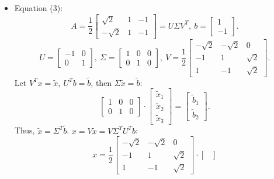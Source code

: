\documentclass[14pt, notitlepage]{article}
\begin{document}
\begin{itemize}
    \item Equation (3):
        \[
            A = \frac{1}{2} \begin{bmatrix}
                \sqrt{2} & 1 & -1 \\
                -\sqrt{2} & 1 & -1
            \end{bmatrix} = U \Sigma V^T,\ b = \begin{bmatrix}
                1 \\ -1
            \end{bmatrix}.
        \]
        \[
            U = \begin{bmatrix}
                -1 & 0 \\
                0 & 1
            \end{bmatrix},\ \Sigma = \begin{bmatrix}
                1 & 0 & 0 \\
                0 & 1 & 0
            \end{bmatrix},\ V = \frac{1}{2} \begin{bmatrix}
                -\sqrt{2} & -\sqrt{2} & 0 \\
                -1 & 1 & \sqrt{2} \\
                1 & -1 & \sqrt{2}
            \end{bmatrix}.
        \]
        Let $V^T x = \tilde{x},\ U^T b = \tilde{b}$, then $\Sigma \tilde{x} = \tilde{b}$:
        \[
            \begin{bmatrix}
                1 & 0 & 0 \\
                0 & 1 & 0
            \end{bmatrix} \cdot \begin{bmatrix}
                \tilde{x}_1 \\ \tilde{x}_2 \\ \tilde{x}_3
            \end{bmatrix} = \begin{bmatrix}
                \tilde{b}_1 \\ \tilde{b}_2
            \end{bmatrix}.
        \]
        Thus, $\tilde{x} = \Sigma^T \tilde{b}$. $x = V\tilde{x} = V \Sigma^T U^T b$:
        \[
            x = \frac{1}{2} \begin{bmatrix}
                -\sqrt{2} & -\sqrt{2} & 0 \\
                -1 & 1 & \sqrt{2} \\
                1 & -1 & \sqrt{2}
            \end{bmatrix} \cdot \begin{bmatrix}

\end{bmatrix}\]
\end{itemize}
\end{document}
